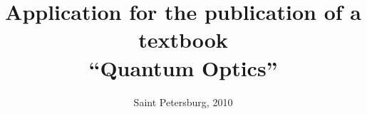 \title{Application for the publication of a textbook \\ ``Quantum Optics''}
\author{}
\date{Saint Petersburg, 2010}
\maketitle
\thispagestyle{empty}
\newpage